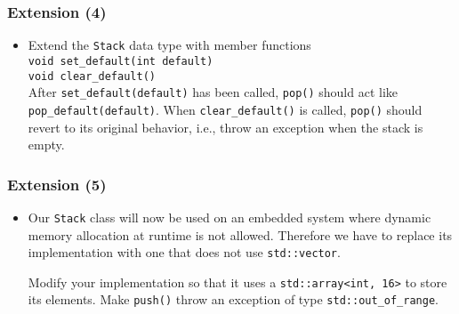 \documentclass[10pt,aspectratio=169]{beamer}
\begin{document}
\begin{frame}[fragile]
  \frametitle{Extension (4)}  
  \begin{itemize}
  \item Extend the \texttt{Stack} data type with member functions\\[1ex]
    \verb!void set_default(int default)!\\
    \verb!void clear_default()!\\[1ex]
    After \verb!set_default(default)! has been called, \texttt{pop()}
    should act like \verb!pop_default(default)!. When
    \verb!clear_default()! is called, \texttt{pop()} should revert to
    its original behavior, i.e., throw an exception when the stack is
    empty.
  \end{itemize}
\end{frame}

\begin{frame}[fragile]
  \frametitle{Extension (5)}
  \begin{itemize}
  \item Our \texttt{Stack} class will now be used on an embedded
    system where dynamic memory allocation at runtime is not allowed.
    Therefore we have to replace its implementation with one that does
    not use \verb!std::vector!.

    Modify your implementation so that it uses a
    \verb|std::array<int, 16>| to store its elements. Make
    \texttt{push()} throw an exception of type
    \verb!std::out_of_range!.
  \end{itemize}
\end{frame}

\end{document}
